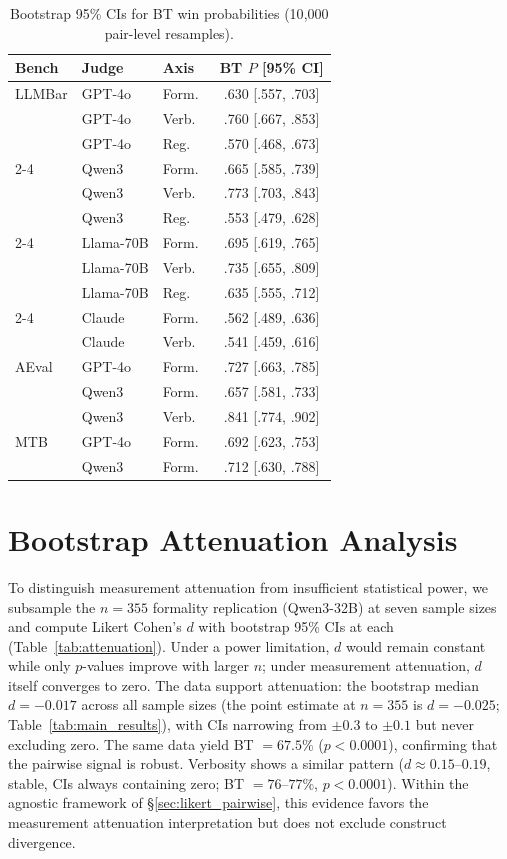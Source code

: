 \begin{table}[h]
\centering
\small
\caption{Bootstrap 95\% CIs for BT win probabilities (10{,}000 pair-level resamples).}
\label{tab:bt_ci}
\begin{tabular}{lllc}
\toprule
Bench & Judge & Axis & BT $P$ [95\% CI] \\
\midrule
LLMBar & GPT-4o & Form.\ & .630 [.557, .703] \\
 & GPT-4o & Verb.\ & .760 [.667, .853] \\
 & GPT-4o & Reg.\ & .570 [.468, .673] \\
\cmidrule{2-4}
 & Qwen3 & Form.\ & .665 [.585, .739] \\
 & Qwen3 & Verb.\ & .773 [.703, .843] \\
 & Qwen3 & Reg.\ & .553 [.479, .628] \\
\cmidrule{2-4}
 & Llama-70B & Form.\ & .695 [.619, .765] \\
 & Llama-70B & Verb.\ & .735 [.655, .809] \\
 & Llama-70B & Reg.\ & .635 [.555, .712] \\
\cmidrule{2-4}
 & Claude & Form.\ & .562 [.489, .636] \\
 & Claude & Verb.\ & .541 [.459, .616] \\
\midrule
AEval & GPT-4o & Form.\ & .727 [.663, .785] \\
 & Qwen3 & Form.\ & .657 [.581, .733] \\
 & Qwen3 & Verb.\ & .841 [.774, .902] \\
\midrule
MTB & GPT-4o & Form.\ & .692 [.623, .753] \\
 & Qwen3 & Form.\ & .712 [.630, .788] \\
\bottomrule
\end{tabular}
\end{table}

\section{Bootstrap Attenuation Analysis}
\label{app:bootstrap_attenuation}

To distinguish measurement attenuation from insufficient statistical power, we subsample the $n = 355$ formality replication (Qwen3-32B) at seven sample sizes and compute Likert Cohen's $d$ with bootstrap 95\% CIs at each (Table~\ref{tab:attenuation}).
Under a power limitation, $d$ would remain constant while only $p$-values improve with larger $n$; under measurement attenuation, $d$ itself converges to zero.
The data support attenuation: the bootstrap median $d = {-}0.017$ across all sample sizes (the point estimate at $n = 355$ is $d = {-}0.025$; Table~\ref{tab:main_results}), with CIs narrowing from ${\pm}0.3$ to ${\pm}0.1$ but never excluding zero.
The same data yield BT $= 67.5\%$ ($p < 0.0001$), confirming that the pairwise signal is robust.
Verbosity shows a similar pattern ($d \approx 0.15$--$0.19$, stable, CIs always containing zero; BT $= 76$--$77\%$, $p < 0.0001$).
Within the agnostic framework of \S\ref{sec:likert_pairwise}, this evidence favors the measurement attenuation interpretation but does not exclude construct divergence.

